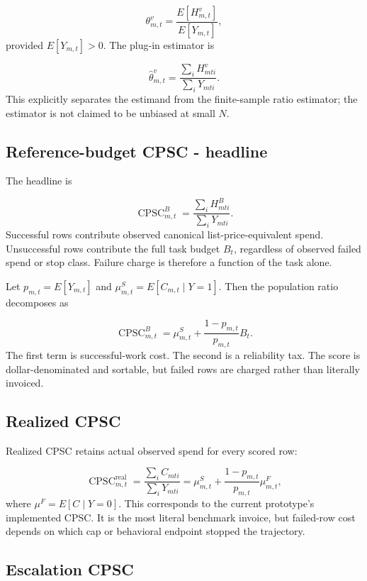 \documentclass[11pt]{article}
\begin{document}
\[
\theta^v_{m,t}=\frac{E[H^v_{m,t}]}{E[Y_{m,t}]},
\]
provided $E[Y_{m,t}]>0$. The plug-in estimator is

\[
\widehat\theta^v_{m,t}=
\frac{\sum_i H^v_{mti}}{\sum_i Y_{mti}}.
\]
This explicitly separates the estimand from the finite-sample ratio estimator; the estimator is not claimed to be unbiased at small $N$.

\subsection{Reference-budget CPSC - headline}\hypertarget{82-reference-budget-cpsc---headline}{}\label{82-reference-budget-cpsc---headline}

The headline is

\[
\operatorname{CPSC}^{B}_{m,t}
=\frac{\sum_i H^{B}_{mti}}{\sum_iY_{mti}}.
\]
Successful rows contribute observed canonical list-price-equivalent spend. Unsuccessful rows contribute the full task budget $B_t$, regardless of observed failed spend or stop class. Failure charge is therefore a function of the task alone.

Let $p_{m,t}=E[Y_{m,t}]$ and $\mu^S_{m,t}=E[C_{m,t}\mid Y=1]$. Then the population ratio decomposes as

\[
\operatorname{CPSC}^{B}_{m,t}
=\mu^S_{m,t}+\frac{1-p_{m,t}}{p_{m,t}}B_t.
\]
The first term is successful-work cost. The second is a reliability tax. The score is dollar-denominated and sortable, but failed rows are charged rather than literally invoiced.

\subsection{Realized CPSC}\hypertarget{83-realized-cpsc}{}\label{83-realized-cpsc}

Realized CPSC retains actual observed spend for every scored row:

\[
\operatorname{CPSC}^{\mathrm{real}}_{m,t}
=\frac{\sum_i C_{mti}}{\sum_iY_{mti}}
=\mu^S_{m,t}+\frac{1-p_{m,t}}{p_{m,t}}\mu^F_{m,t},
\]
where $\mu^F=E[C\mid Y=0]$. This corresponds to the current prototype's implemented CPSC. It is the most literal benchmark invoice, but failed-row cost depends on which cap or behavioral endpoint stopped the trajectory.

\subsection{Escalation CPSC}\hypertarget{84-escalation-cpsc}{}\label{84-escalation-cpsc}
\end{document}

